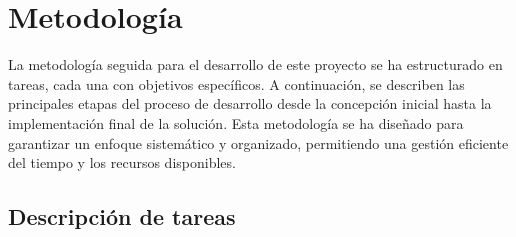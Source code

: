 \chapter{Metodología}
\label{cap:metodologia}

La metodología seguida para el desarrollo de este proyecto se ha estructurado en tareas, cada una con objetivos específicos. A continuación, se describen las principales etapas del proceso de desarrollo desde la concepción inicial hasta la implementación final de la solución. Esta metodología se ha diseñado para garantizar un enfoque sistemático y organizado, permitiendo una gestión eficiente del tiempo y los recursos disponibles.
\section{Descripción de tareas}

